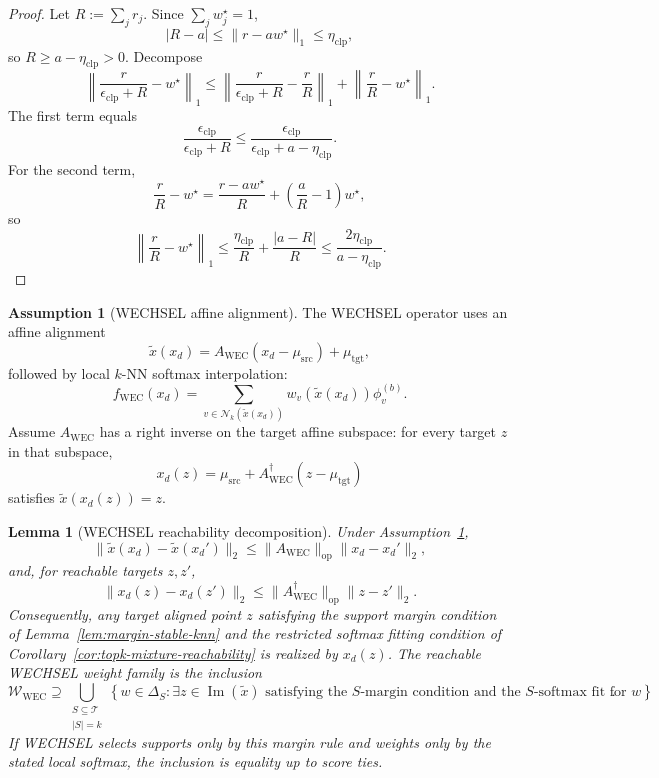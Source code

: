 \documentclass{article}
\theoremstyle{plain}
\newtheorem{lemma}[theorem]{Lemma}
\theoremstyle{definition}
\newtheorem{assumption}[theorem]{Assumption}
\theoremstyle{remark}
\begin{document}
\begin{proof}
Let $R:=\sum_j r_j$. Since $\sum_j w_j^\star=1$,
\[
|R-a|\le \|r-aw^\star\|_1\le \eta_{\mathrm{clp}},
\]
so $R\ge a-\eta_{\mathrm{clp}}>0$. Decompose
\[
\left\|\frac{r}{\epsilon_{\mathrm{clp}}+R}-w^\star\right\|_1
\le
\left\|\frac{r}{\epsilon_{\mathrm{clp}}+R}-\frac{r}{R}\right\|_1
+
\left\|\frac{r}{R}-w^\star\right\|_1.
\]
The first term equals
\[
\frac{\epsilon_{\mathrm{clp}}}{\epsilon_{\mathrm{clp}}+R}
\le
\frac{\epsilon_{\mathrm{clp}}}{\epsilon_{\mathrm{clp}}+a-\eta_{\mathrm{clp}}}.
\]
For the second term,
\[
\frac{r}{R}-w^\star
=
\frac{r-aw^\star}{R}+
\left(\frac{a}{R}-1\right)w^\star,
\]
so
\[
\left\|\frac{r}{R}-w^\star\right\|_1
\le
\frac{\eta_{\mathrm{clp}}}{R}+\frac{|a-R|}{R}
\le
\frac{2\eta_{\mathrm{clp}}}{a-\eta_{\mathrm{clp}}}.
\]
\end{proof}

\begin{assumption}[WECHSEL affine alignment]
\label{ass:wechsel-affine}
The WECHSEL operator uses an affine alignment
\[
\widetilde{x}(x_d)=A_{\mathrm{WEC}}(x_d-\mu_{\mathrm{src}})+\mu_{\mathrm{tgt}},
\]
followed by local $k$-NN softmax interpolation:
\[
f_{\mathrm{WEC}}(x_d)=
\sum_{v\in\mathcal{N}_k(\widetilde{x}(x_d))}
w_v(\widetilde{x}(x_d))\phi_v^{(b)}.
\]
Assume $A_{\mathrm{WEC}}$ has a right inverse on the target affine subspace: for every target $z$ in that subspace,
\[
x_d(z)=\mu_{\mathrm{src}}+A_{\mathrm{WEC}}^\dagger(z-\mu_{\mathrm{tgt}})
\]
satisfies $\widetilde{x}(x_d(z))=z$.
\end{assumption}

\begin{lemma}[WECHSEL reachability decomposition]
\label{lem:wechsel-reachability}
Under Assumption~\ref{ass:wechsel-affine},
\[
\|\widetilde{x}(x_d)-\widetilde{x}(x_d')\|_2
\le
\|A_{\mathrm{WEC}}\|_{\mathrm{op}}\|x_d-x_d'\|_2,
\]
and, for reachable targets $z,z'$,
\[
\|x_d(z)-x_d(z')\|_2
\le
\|A_{\mathrm{WEC}}^\dagger\|_{\mathrm{op}}\|z-z'\|_2.
\]
Consequently, any target aligned point $z$ satisfying the support margin condition of Lemma~\ref{lem:margin-stable-knn} and the restricted softmax fitting condition of Corollary~\ref{cor:topk-mixture-reachability} is realized by $x_d(z)$. The reachable WECHSEL weight family is the inclusion
\[
\mathcal{W}_{\mathrm{WEC}}
\supseteq
\bigcup_{\substack{S\subseteq\mathcal{T}\\ |S|=k}}
\left\{
 w\in\Delta_S:
 \exists z\in\operatorname{Im}(\widetilde{x})\text{ satisfying the }S\text{-margin condition and the }S\text{-softmax fit for }w
\right\}.
\]
If WECHSEL selects supports only by this margin rule and weights only by the stated local softmax, the inclusion is equality up to score ties.
\end{lemma}
\end{document}
